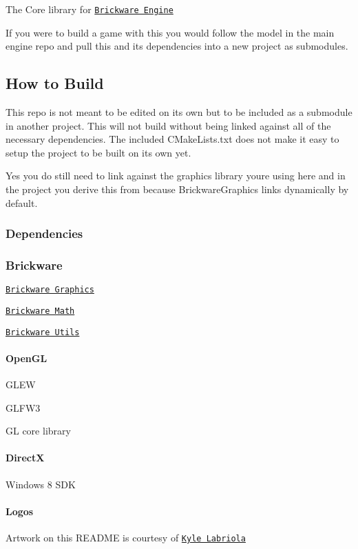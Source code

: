  

The Core library for \href{http://github.com/Honeybunch/Brickware-Engine}{\tt Brickware Engine}

If you were to build a game with this you would follow the model in the main engine repo and pull this and its dependencies into a new project as submodules. 



\subsection*{How to Build}

This repo is not meant to be edited on its own but to be included as a submodule in another project. This will not build without being linked against all of the necessary dependencies. The included C\+Make\+Lists.\+txt does not make it easy to setup the project to be built on its own yet.

Yes you do still need to link against the graphics library you\textquotesingle{}re using here and in the project you derive this from because Brickware\+Graphics links dynamically by default.

\subsubsection*{Dependencies}

\subsubsection*{Brickware}


\begin{DoxyItemize}
\item \href{http://github.com/Honeybunch/BrickwareGraphics}{\tt Brickware Graphics}
\item \href{http://github.com/Honeybunch/BrickwareMath}{\tt Brickware Math}
\item \href{http://github.com/Honeybunch/BrickwareUtils}{\tt Brickware Utils}
\end{DoxyItemize}

\paragraph*{Open\+G\+L}


\begin{DoxyItemize}
\item G\+L\+E\+W
\item G\+L\+F\+W3
\item G\+L core library
\end{DoxyItemize}

\paragraph*{Direct\+X}


\begin{DoxyItemize}
\item Windows 8 S\+D\+K
\end{DoxyItemize}

\paragraph*{Logos}

Artwork on this R\+E\+A\+D\+M\+E is courtesy of \href{http://www.kylelabriola.com/}{\tt Kyle Labriola} 